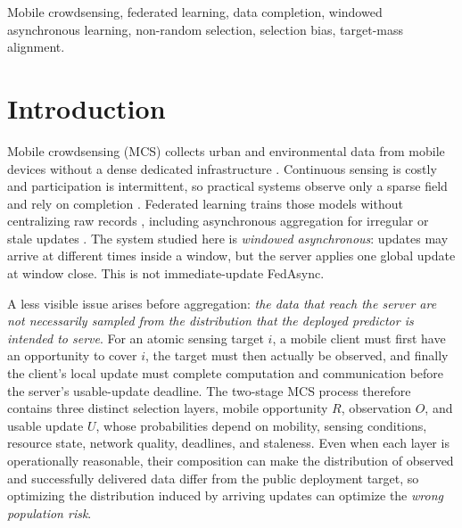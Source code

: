 \documentclass[letterpaper,journal]{IEEEtran}
\begin{document}
\begin{IEEEkeywords}
Mobile crowdsensing, federated learning, data completion, windowed asynchronous learning, non-random selection, selection bias, target-mass alignment.
\end{IEEEkeywords}


\section{Introduction}
\label{sec:introduction}

Mobile crowdsensing (MCS) collects urban and environmental data from mobile
devices without a dense dedicated infrastructure
\cite{ganti2011mobile,guo2015mobile,ma2014opportunities}.
Continuous sensing is costly and participation is intermittent, so practical
systems observe only a sparse field and rely on completion
\cite{wang2023outlier,li2024robust,wang2023transformer,wang2024fewshot,wang2025evolutionary,xu2025rethinking,liu2026pyramid,zhang2026mapt}.
Federated learning trains those models without centralizing raw records
\cite{mcmahan2017communication,yang2019federated,kairouz2021advances,li2020federated},
including asynchronous aggregation for irregular or stale updates
\cite{wang2026federated,xie2019asynchronous,liu2023adaptive,sun2024staleness}.
The system studied here is \emph{windowed asynchronous}: updates may arrive at
different times inside a window, but the server applies one global update at
window close.  This is not immediate-update FedAsync.

A less visible issue arises before aggregation: \emph{the data that reach the
server are not necessarily sampled from the distribution that the deployed
predictor is intended to serve}.  For an atomic sensing target $i$, a mobile
client must first have an opportunity to cover $i$, the target must then actually
be observed, and finally the client's local update must complete computation and
communication before the server's usable-update deadline.  The two-stage MCS
process therefore contains three distinct selection layers, mobile opportunity
$R$, observation $O$, and usable update $U$, whose probabilities depend on
mobility, sensing conditions, resource state, network quality, deadlines, and
staleness.  Even when each layer is operationally reasonable, their composition
can make the distribution of observed and successfully delivered data differ
from the public deployment target, so optimizing the distribution induced by
arriving updates can optimize the \emph{wrong population risk}.
\end{document}
